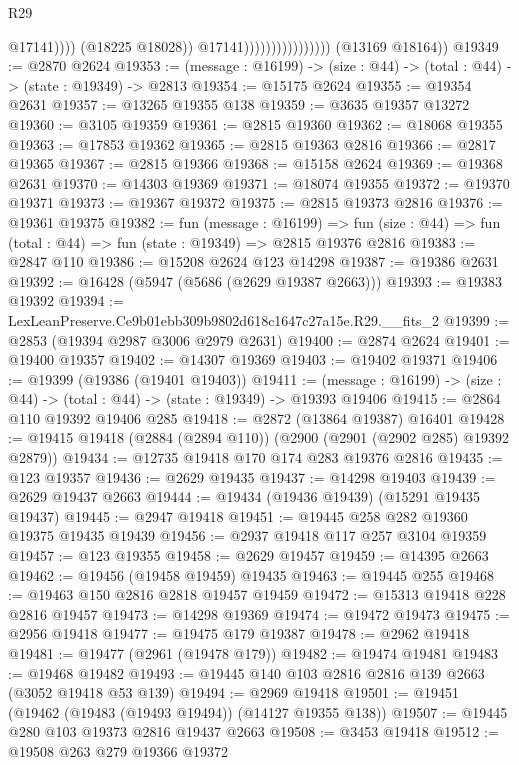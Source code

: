 \begin{lexlean}{R29}
\begin{coremodule}
                                                @17141))))
                                        (@18225 @18028))
                                      @17141))))))))))))))))
      (@13169 @18164))
@19349 := @2870 @2624
@19353 := (message : @16199) -> (size : @44) -> (total : @44) -> (state : @19349) -> @2813
@19354 := @15175 @2624
@19355 := @19354 @2631
@19357 := @13265 @19355 @138
@19359 := @3635 @19357 @13272
@19360 := @3105 @19359
@19361 := @2815 @19360
@19362 := @18068 @19355
@19363 := @17853 @19362
@19365 := @2815 @19363 @2816
@19366 := @2817 @19365
@19367 := @2815 @19366
@19368 := @15158 @2624
@19369 := @19368 @2631
@19370 := @14303 @19369
@19371 := @18074 @19355
@19372 := @19370 @19371
@19373 := @19367 @19372
@19375 := @2815 @19373 @2816
@19376 := @19361 @19375
@19382 := fun (message : @16199) =>
  fun (size : @44) => fun (total : @44) => fun (state : @19349) => @2815 @19376 @2816
@19383 := @2847 @110
@19386 := @15208 @2624 @123 @14298
@19387 := @19386 @2631
@19392 := @16428 (@5947 (@5686 (@2629 @19387 @2663)))
@19393 := @19383 @19392
@19394 := LexLeanPreserve.Ce9b01ebb309b9802d618c1647c27a15e.R29.__fits_2
@19399 := @2853 (@19394 @2987 @3006 @2979 @2631)
@19400 := @2874 @2624
@19401 := @19400 @19357
@19402 := @14307 @19369
@19403 := @19402 @19371
@19406 := @19399 (@19386 (@19401 @19403))
@19411 := (message : @16199) -> (size : @44) -> (total : @44) -> (state : @19349) -> @19393 @19406
@19415 := @2864 @110 @19392 @19406 @285
@19418 := @2872 (@13864 @19387) @16401
@19428 := @19415 @19418 (@2884 (@2894 @110)) (@2900 (@2901 (@2902 @285) @19392 @2879))
@19434 := @12735 @19418 @170 @174 @283 @19376 @2816
@19435 := @123 @19357
@19436 := @2629 @19435
@19437 := @14298 @19403
@19439 := @2629 @19437 @2663
@19444 := @19434 (@19436 @19439) (@15291 @19435 @19437)
@19445 := @2947 @19418
@19451 := @19445 @258 @282 @19360 @19375 @19435 @19439
@19456 := @2937 @19418 @117 @257 @3104 @19359
@19457 := @123 @19355
@19458 := @2629 @19457
@19459 := @14395 @2663
@19462 := @19456 (@19458 @19459) @19435
@19463 := @19445 @255
@19468 := @19463 @150 @2816 @2818 @19457 @19459
@19472 := @15313 @19418 @228 @2816 @19457
@19473 := @14298 @19369
@19474 := @19472 @19473
@19475 := @2956 @19418
@19477 := @19475 @179 @19387
@19478 := @2962 @19418
@19481 := @19477 (@2961 (@19478 @179))
@19482 := @19474 @19481
@19483 := @19468 @19482
@19493 := @19445 @140 @103 @2816 @2816 @139 @2663 (@3052 @19418 @53 @139)
@19494 := @2969 @19418
@19501 := @19451 (@19462 (@19483 (@19493 @19494)) (@14127 @19355 @138))
@19507 := @19445 @280 @103 @19373 @2816 @19437 @2663
@19508 := @3453 @19418
@19512 := @19508 @263 @279 @19366 @19372

\end{coremodule}
\end{lexlean}
